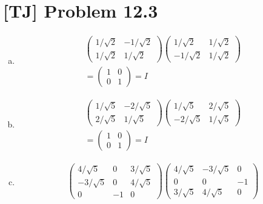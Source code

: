 \documentclass[a4paper,11pt,twocolumn]{article}
\begin{document}
  \section{[TJ] Problem 12.3}
  \begin{enumerate}[(a)]
    \item
    \begin{gather*}
      \begin{pmatrix}
        1/\sqrt{2} & -1/\sqrt{2} \\
        1/\sqrt{2} & 1/\sqrt{2}
      \end{pmatrix}
      \begin{pmatrix}
        1/\sqrt{2} & 1/\sqrt{2} \\
        -1/\sqrt{2} & 1/\sqrt{2}
      \end{pmatrix} \\
    =  \begin{pmatrix} 1 & 0 \\ 0 & 1 \end{pmatrix} = I
    \end{gather*}
    \item
    \begin{gather*}
      \begin{pmatrix}
        1/\sqrt{5} & -2/\sqrt{5} \\
        2/\sqrt{5} & 1/\sqrt{5}
      \end{pmatrix}
      \begin{pmatrix}
        1/\sqrt{5} & 2/\sqrt{5} \\
        -2/\sqrt{5} & 1/\sqrt{5}
      \end{pmatrix} \\
    =  \begin{pmatrix} 1 & 0 \\ 0 & 1 \end{pmatrix} = I
    \end{gather*}
    \item
    \begin{gather*}
      \begin{pmatrix}
        4/\sqrt{5} & 0 & 3/\sqrt{5} \\
        -3/\sqrt{5} & 0 & 4/\sqrt{5} \\
        0 & -1 & 0
      \end{pmatrix}
      \begin{pmatrix}
        4/\sqrt{5} & -3/\sqrt{5} & 0 \\
        0 & 0 & -1 \\
        3/\sqrt{5} & 4/\sqrt{5} & 0
      \end{pmatrix} \\

\end{gather*}
\end{enumerate}
\end{document}
